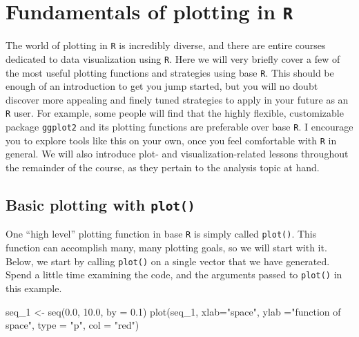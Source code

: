 \documentclass[
]{book}
\newenvironment{Shaded}{\begin{snugshade}}{\end{snugshade}}
\newcommand{\AttributeTok}[1]{\textcolor[rgb]{0.77,0.63,0.00}{#1}}
\newcommand{\FloatTok}[1]{\textcolor[rgb]{0.00,0.00,0.81}{#1}}
\newcommand{\FunctionTok}[1]{\textcolor[rgb]{0.00,0.00,0.00}{#1}}
\newcommand{\NormalTok}[1]{#1}
\newcommand{\OtherTok}[1]{\textcolor[rgb]{0.56,0.35,0.01}{#1}}
\newcommand{\StringTok}[1]{\textcolor[rgb]{0.31,0.60,0.02}{#1}}
\begin{document}
\hypertarget{fundamentals-of-plotting-in-r}{%
\section{\texorpdfstring{Fundamentals of plotting in \texttt{R}}{Fundamentals of plotting in R}}\label{fundamentals-of-plotting-in-r}}

The world of plotting in \texttt{R} is incredibly diverse, and there are entire courses dedicated to data visualization using \texttt{R}. Here we will very briefly cover a few of the most useful plotting functions and strategies using base \texttt{R}. This should be enough of an introduction to get you jump started, but you will no doubt discover more appealing and finely tuned strategies to apply in your future as an \texttt{R} user. For example, some people will find that the highly flexible, customizable package \texttt{ggplot2} and its plotting functions are preferable over base \texttt{R}. I encourage you to explore tools like this on your own, once you feel comfortable with \texttt{R} in general. We will also introduce plot- and visualization-related lessons throughout the remainder of the course, as they pertain to the analysis topic at hand.

\hypertarget{basic-plotting-with-plot}{%
\subsection{\texorpdfstring{Basic plotting with \texttt{plot()}}{Basic plotting with plot()}}\label{basic-plotting-with-plot}}

One ``high level'' plotting function in base \texttt{R} is simply called \texttt{plot()}. This function can accomplish many, many plotting goals, so we will start with it. Below, we start by calling \texttt{plot()} on a single vector that we have generated. Spend a little time examining the code, and the arguments passed to \texttt{plot()} in this example.

\begin{Shaded}
\begin{Highlighting}[]
\NormalTok{seq\_1 }\OtherTok{\textless{}{-}} \FunctionTok{seq}\NormalTok{(}\FloatTok{0.0}\NormalTok{, }\FloatTok{10.0}\NormalTok{, }\AttributeTok{by =} \FloatTok{0.1}\NormalTok{) }
\FunctionTok{plot}\NormalTok{(seq\_1, }\AttributeTok{xlab=}\StringTok{"space"}\NormalTok{, }\AttributeTok{ylab =}\StringTok{"function of space"}\NormalTok{, }\AttributeTok{type =} \StringTok{"p"}\NormalTok{, }\AttributeTok{col =} \StringTok{"red"}\NormalTok{)}
\end{Highlighting}
\end{Shaded}
\end{document}
